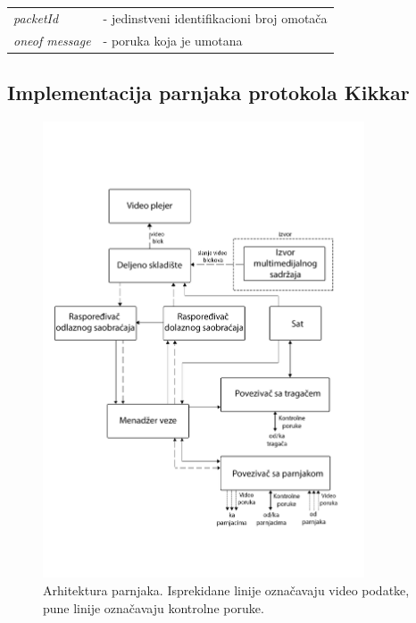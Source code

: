 \documentclass[12pt,oneside]{memoir}
\begin{document}
\begin{center}
\begin{tabular}{ p{4cm} p{10cm} }
 \textit{packetId} & - jedinstveni identifikacioni broj omotača \\ 
 \textit{oneof message} & - poruka koja je umotana \\ 
\end{tabular}
\end{center}


\subsection{Implementacija parnjaka protokola Kikkar}
\label{implementacija.2.3}

\begin{figure}[!ht]
  \centering
  \includegraphics[width=0.85\textwidth]{slike/arhitektura-sistema.png}
  \caption{Arhitektura parnjaka. Isprekidane linije označavaju video podatke, pune linije označavaju kontrolne poruke.}
  \label{fig:arhitektura}
\end{figure}
\par
\end{document}
